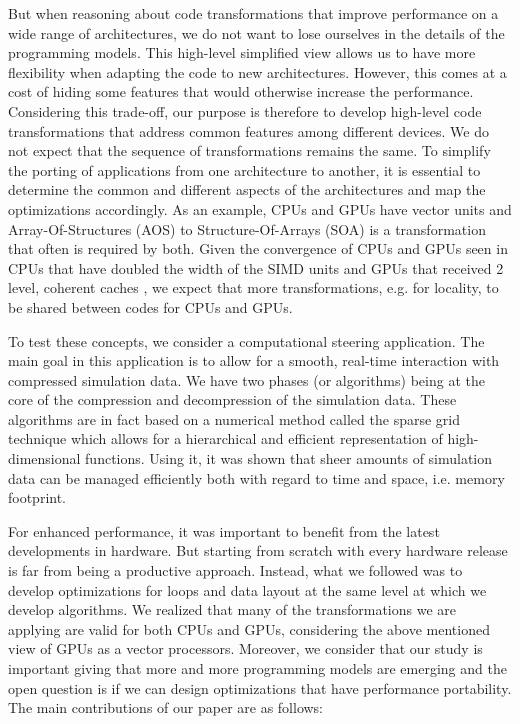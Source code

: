 But when reasoning about code transformations that improve performance on a wide
range of architectures, we do not want to lose ourselves in the details of the
programming models. This high-level simplified view allows us to have more
flexibility when adapting the code to new architectures. However, this comes at
a cost of hiding some features that would otherwise increase the performance.
Considering this trade-off, our purpose is therefore to develop high-level code
transformations that address common features among different devices. We do not
expect that the sequence of transformations remains the same. To simplify the
porting of applications from one architecture to another, it is essential to
determine the common and different aspects of the architectures and map the
optimizations accordingly. As an example, CPUs and GPUs have vector units and
Array-Of-Structures (AOS) to Structure-Of-Arrays (SOA) is a transformation that
often is required by both. Given the convergence of CPUs and GPUs seen in CPUs
that have doubled the width of the SIMD units and GPUs that received 2 level,
coherent caches \cite{fermi}, we expect that more transformations, e.g. for
locality, to be shared between codes for CPUs and GPUs.

To test these concepts, we consider a computational steering application. The
main goal in this application is to allow for a smooth, real-time interaction
with compressed simulation data. We have two phases (or algorithms) being at the
core of the compression and decompression of the simulation data. These
algorithms are in fact based on a numerical method called the sparse grid
technique which allows for a hierarchical and efficient representation of
high-dimensional functions. Using it, it was shown that sheer amounts of
simulation data can be managed efficiently both with regard to time and space,
i.e. memory footprint.

For enhanced performance, it was important to benefit from the latest
developments in hardware. But starting from scratch with every hardware release
is far from being a productive approach. Instead, what we followed was to
develop optimizations for loops and data layout at the same level at which we
develop algorithms. We realized that many of the transformations we are applying
are valid for both CPUs and GPUs, considering the above mentioned view of GPUs
as a vector processors. Moreover, we consider that our study is important giving
that more and more programming models are emerging and the open question is if
we can design optimizations that have performance portability. The main
contributions of our paper are as follows:


